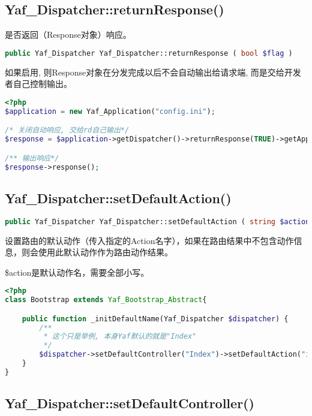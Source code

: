 \subsection{Yaf\_Dispatcher::returnResponse()}

是否返回（Response对象）响应。

\begin{lstlisting}[language=PHP]
public Yaf_Dispatcher Yaf_Dispatcher::returnResponse ( bool $flag )
\end{lstlisting}

如果启用, 则Response对象在分发完成以后不会自动输出给请求端, 而是交给开发者自己控制输出。

\begin{lstlisting}[language=PHP]
<?php
$application = new Yaf_Application("config.ini");

/* 关闭自动响应, 交给rd自己输出*/
$response = $application->getDispatcher()->returnResponse(TRUE)->getApplication()->run();

/** 输出响应*/
$response->response();
\end{lstlisting}

\subsection{Yaf\_Dispatcher::setDefaultAction()}

\begin{lstlisting}[language=PHP]
public Yaf_Dispatcher Yaf_Dispatcher::setDefaultAction ( string $action )
\end{lstlisting}

设置路由的默认动作（传入指定的Action名字），如果在路由结果中不包含动作信息，则会使用此默认动作作为路由动作结果。


\$action是默认动作名，需要全部小写。

\begin{lstlisting}[language=PHP]
<?php
class Bootstrap extends Yaf_Bootstrap_Abstract{

    public function _initDefaultName(Yaf_Dispatcher $dispatcher) {
        /**
         * 这个只是举例, 本身Yaf默认的就是"Index"
         */
        $dispatcher->setDefaultController("Index")->setDefaultAction("index");
    }
}
\end{lstlisting}

\subsection{Yaf\_Dispatcher::setDefaultController()}

